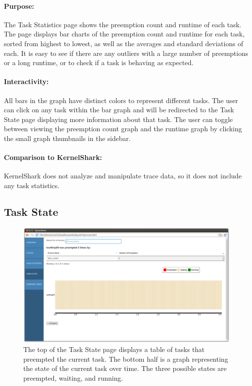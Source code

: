 \documentclass{hmcclinic}
\begin{document}
\paragraph{Purpose:}
The Task Statistics page shows the preemption count and runtime of each task. The page displays bar charts of the preemption count and runtime for each task, sorted from highest to lowest, as well as the averages and standard deviations of each. It is easy to see if there are any outliers with a large number of preemptions or a long runtime, or to check if a task is behaving as expected.

\paragraph{Interactivity:}
All bars in the graph have distinct colors to represent different tasks. The user can click on any task within the bar graph and will be redirected to the Task State page displaying more information about that task. The user can toggle between viewing the preemption count graph and the runtime graph by clicking the small graph thumbnails in the sidebar.

\paragraph{Comparison to KernelShark:} KernelShark does not analyze and manipulate trace data, so it does not include any task statistics. 


  \subsection{Task State}

  \begin{figure}[H]
  \includegraphics[scale=0.25]{task-state-page.png}
  \caption{The top of the Task State page displays a table of tasks
  that preempted the current task. The bottom half is a graph representing the
state of the current task over time. The three possible states are preempted,
waiting, and running.}
\end{figure}
\end{document}
